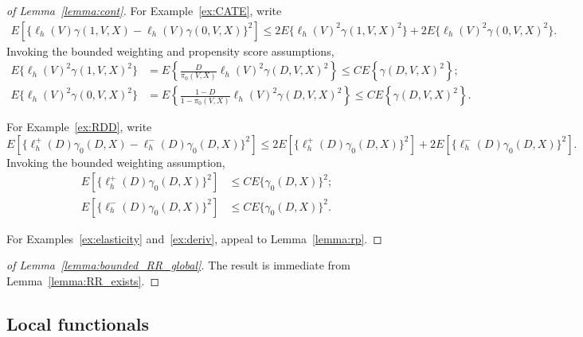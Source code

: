 \begin{proof}[of Lemma~\ref{lemma:cont}]
For Example~\ref{ex:CATE}, write
\begin{align*}
    E [\{\ell_h(V)\gamma(1,V,X)-\ell_h(V)\gamma(0,V,X)\}^2 ]\leq 2E\{\ell_h(V)^2\gamma(1,V,X)^2\}+2E\{\ell_h(V)^2\gamma(0,V,X)^2\}.
\end{align*}
Invoking the bounded weighting and propensity score assumptions,
\begin{align*}
   E\{\ell_h(V)^2\gamma(1,V,X)^2\}&=E \left\{\frac{D}{\pi_0(V,X)}\ell_h(V)^2\gamma(D,V,X)^2\right\} \leq C E \left\{\gamma(D,V,X)^2\right\}; \\
    E\{\ell_h(V)^2\gamma(0,V,X)^2\}&=E \left\{\frac{1-D}{1-\pi_0(V,X)}\ell_h(V)^2\gamma(D,V,X)^2\right\} \leq C E \left\{\gamma(D,V,X)^2\right\}.
\end{align*}

For Example~\ref{ex:RDD}, write
$$
E[\{\ell^{+}_{h}(D)\gamma_0(D,X)-\ell^{-}_{h}(D)\gamma_0(D,X)\}^2]\leq 2 E[\{\ell^{+}_{h}(D)\gamma_0(D,X)\}^2]+2E[\{\ell^{-}_{h}(D)\gamma_0(D,X)\}^2].
$$
Invoking the bounded weighting assumption,
\begin{align*}
    E[\{\ell^{+}_{h}(D)\gamma_0(D,X)\}^2]&\leq CE\{\gamma_0(D,X)\}^2; \\
     E[\{\ell^{-}_{h}(D)\gamma_0(D,X)\}^2]&\leq CE\{\gamma_0(D,X)\}^2. 
\end{align*}

For Examples~\ref{ex:elasticity} and~\ref{ex:deriv}, appeal to Lemma~\ref{lemma:rp}.
\end{proof}

\begin{proof}[of Lemma~\ref{lemma:bounded_RR_global}]
The result is immediate from Lemma~\ref{lemma:RR_exists}.
\end{proof}

\subsection{Local functionals}

